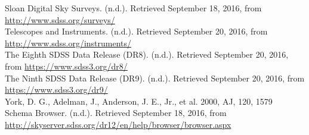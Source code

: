 \documentclass[10pt,letterpaper]{article}
\begin{document}
\begin{thebibliography}{1}
 Sloan Digital Sky Surveys. (n.d.). Retrieved September 18, 2016, from \url{http://www.sdss.org/surveys/}\\

 Telescopes and Instruments. (n.d.). Retrieved September 20, 2016, from \url{http://www.sdss.org/instruments/}\\

 The Eighth SDSS Data Release (DR8). (n.d.). Retrieved September 20, 2016, from \url{https://www.sdss3.org/dr8/}\\

 The Ninth SDSS Data Release (DR9). (n.d.). Retrieved September 20, 2016, from \url{https://www.sdss3.org/dr9/}\\

 York, D. G., Adelman, J., Anderson, J. E., Jr., et al. 2000, AJ, 120, 1579\\

 Schema Browser. (n.d.). Retrieved September 18, 2016, from \url{http://skyserver.sdss.org/dr12/en/help/browser/browser.aspx}\\

\end{thebibliography}
\end{document}
